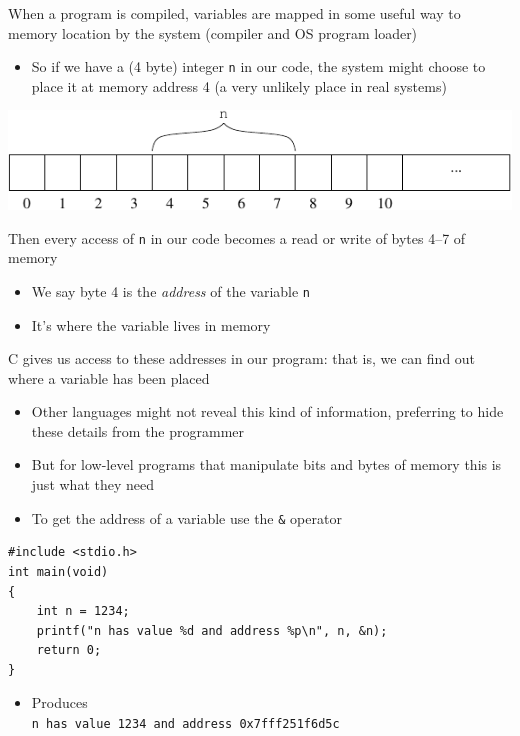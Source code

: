 \documentclass{beamer}
\def\code#1{{\ifmmode\else\large\fi\tt#1}}
\begin{document}
\begin{frame}
When a program is compiled, variables are mapped in some useful way to
memory location by the system (compiler and OS program loader)
\begin{itemize}
\item{So if we have a (4 byte) integer \code{n} in our code, the
  system might choose to place it at memory address 4 (a very unlikely place
  in real systems)}
\end{itemize}
\bigskip
\begin{center}
\includegraphics[keepaspectratio]{Pics/bytes2}
\end{center}
\end{frame}

\begin{frame}
Then every access of \code{n} in our code becomes a read or write of bytes 4--7
of memory
\begin{itemize}
\item{We say byte 4 is the {\em address\/} of the variable \code{n}}

\item{It's where the variable lives in memory}
\end{itemize}
\end{frame}

\begin{frame}
C gives us access to these addresses in our program: that is, we can find out
where a variable has been placed
\begin{itemize}
\item{Other languages might not reveal this kind of information,
  preferring to hide these details from the programmer}

\item{But for low-level programs that manipulate bits and bytes of
  memory this is just what they need}

\item{To get the address of a variable use the \code{\&} operator}
\end{itemize}
\end{frame}

\begin{frame}[fragile]
\begin{block}{}
\begin{lstlisting}
#include <stdio.h>
int main(void)
{
    int n = 1234;
    printf("n has value %d and address %p\n", n, &n);
    return 0; 
}
\end{lstlisting}
\end{block}
\begin{itemize}
\item{Produces\\
\code{n has value 1234 and address 0x7fff251f6d5c}}
\end{itemize}
\end{frame}
\end{document}
